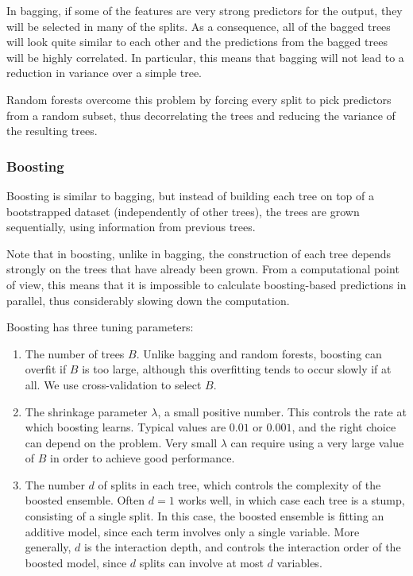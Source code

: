 In bagging, if some of the features are very strong predictors for the output, they will be selected in many of the splits. As a consequence, all of the bagged trees will look quite similar to each other and the predictions from the bagged trees will be highly correlated. In particular, this means that bagging will not lead to a reduction in variance over a simple tree.

Random forests overcome this problem by forcing every split to pick predictors from a random subset, thus decorrelating the trees and reducing the variance of the resulting trees.

\subsubsection{Boosting}
Boosting is similar to bagging, but instead of building each tree on top of a bootstrapped dataset (independently of other trees), the trees are grown sequentially, using information from previous trees.

Note that in boosting, unlike in bagging, the construction of each tree depends strongly on the trees that have already been grown. From a computational point of view, this means that it is impossible to calculate boosting-based predictions in parallel, thus considerably slowing down the computation.

Boosting has three tuning parameters:

\begin{enumerate}
    \item The number of trees $B$. Unlike bagging and random forests, boosting can overfit if $B$ is too large, although this overfitting tends to occur slowly if at all. We use cross-validation to select $B$.
    \item The shrinkage parameter $\lambda$, a small positive number. This controls the rate at which boosting learns. Typical values are $0.01$ or $0.001$, and the right choice can depend on the problem. Very small $\lambda$ can require using a very large value of $B$ in order to achieve good performance.
    \item The number $d$ of splits in each tree, which controls the complexity of the boosted ensemble. Often $d=1$ works well, in which case each tree is a stump, consisting of a single split. In this case, the boosted ensemble is fitting an additive model, since each term involves only a single variable. More generally, $d$ is the interaction depth, and controls the interaction order of the boosted model, since $d$ splits can involve at most $d$ variables.
\end{enumerate}
